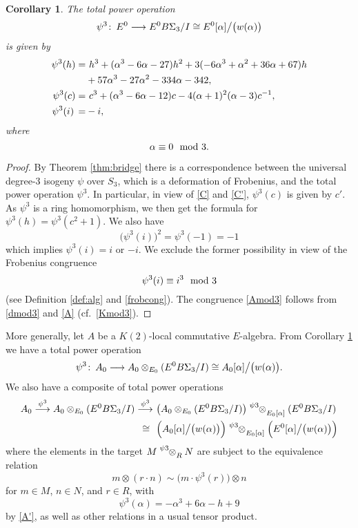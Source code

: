 \documentclass{gtpart}
\newtheorem{cor}[thm]{Corollary}
\theoremstyle{definition}
\theoremstyle{remark}
\def\co{\colon\thinspace}
\newcommand{\md}{~~{\rm mod}~}
\newcommand{\A}{\alpha}
\newcommand{\p}{\psi^3}
\numberwithin{equation}{section}
\numberwithin{thm}{section}
\begin{document}
\begin{cor}
\label{cor:psi3}
 The total power operation 
 \[
  \p \co E^0 \longrightarrow E^0 B\Sigma_3 / I 
  \cong E^0 [\A] \big/ \big( w(\A) \big) 
 \]
 is given by 
 \begin{equation*}
 \begin{split}
  \p(h) = & ~ h^3 + (\A^3 - 6 \A - 27) h^2 + 3 (-6 \A^3 + \A^2 + 36 \A + 67) h \\
          & + 57 \A^3 - 27 \A^2 - 334 \A - 342, \\
  \p(c) = & ~ c^3 + (\A^3 - 6 \A - 12) c - 4 (\A + 1)^2 (\A - 3) c^{-1}, \\
  \p(i) \thinspace = & -i, 
 \end{split}
 \end{equation*}
 where 
 \begin{equation}
 \label{Amod3}
  \A \equiv 0 \md 3.  
 \end{equation}
\end{cor}
\begin{proof}
 By Theorem \ref{thm:bridge} there is a correspondence between the 
 universal degree-3 isogeny $\psi$ over $S_3$, which is a deformation of 
 Frobenius, and the total power operation $\p$.  In particular, in view 
 of \eqref{C} and \eqref{C'}, $\p(c)$ is given by $c'$.  As $\p$ is a 
 ring homomorphism, we then get the formula for $\p(h) = \p(c^2 + 1)$.  
 We also have 
 \[
  \big( \p(i) \big)^2 = \p(-1) = -1 
 \]
 which implies $\p(i) = i$ or $-i$.  We exclude the former possibility 
 in view of the Frobenius congruence 
 \[
  \p(i) \equiv i^3 \md 3 
 \]
 (see Definition \ref{def:alg} and \eqref{frobcong}).  The congruence 
 \eqref{Amod3} follows from \eqref{dmod3} and \eqref{A} 
 (cf.~\eqref{Kmod3}).  
\end{proof}

More generally, let $A$ be a $K(2)$-local commutative $E$-algebra.  
From Corollary \ref{cor:psi3} we have a total power operation 
\[
 \p \co A_0 \longrightarrow A_0 \otimes_{E_0} (E^0 B\Sigma_3 / I) 
 \cong A_0 [\A] \big/ \big( w(\A) \big).  
\]
We also have a composite of total power operations 
\begin{equation}
\label{psi3^2}
\begin{split}
 A_0 \stackrel{\p}{\longrightarrow} A_0 \otimes_{E_0} (E^0 B\Sigma_3 / I) \stackrel{\p}{\longrightarrow} 
 & ~ \big( A_0 \otimes_{E_0} (E^0 B\Sigma_3 / I) \big) \tensor[^\p]{\otimes}{_{E_0 [\A]}} (E^0 B\Sigma_3 / I) \\
 \cong \thinspace \thinspace & ~ \Big( A_0 [\A] \big/ \big( w(\A) \big) \Big) \tensor[^\p]{\otimes}{_{E_0 [\A]}} \Big( E^0 [\A] \big/ \big( w(\A) \big) \Big) 
\end{split}
\end{equation}
where the elements in the target $M \tensor[^\p]{\otimes}{_R} N$ are 
subject to the equivalence relation 
\[
 m \otimes (r \cdot n) \sim \big( m \cdot \p(r) \big) \otimes n 
\]
for $m \in M$, $n \in N$, and $r \in R$, with 
\[
 \p(\A) = -\A^3 + 6 \A - h + 9 
\]
by \eqref{A'}, as well as other relations in a usual tensor product.  
\end{document}
